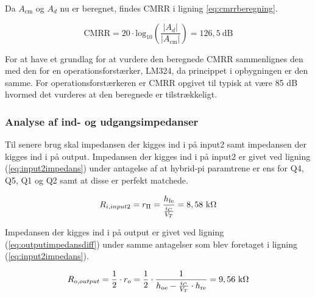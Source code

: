 Da $A_\mathrm{cm}$ og $A_d$ nu er beregnet, findes CMRR i ligning \ref{eq:cmrrberegning}.

\begin{equation}
\mathrm{CMRR}=20 \cdot \mathrm{log}_10 \left( \frac{|A_d|}{|A_\mathrm{cm}|}\right)=126,5~\mathrm{dB}
\label{eq:cmrrberegning}
\end{equation}

For at have et grundlag for at vurdere den beregnede CMRR sammenlignes den med den for en operationsforstærker, LM324, da princippet i opbygningen er den samme. For operationsforstærkeren er CMRR opgivet til typisk at være 85 dB hvormed det vurderes at den beregnede er tilstrækkeligt. 

\subsubsection*{Analyse af ind- og udgangsimpedanser}
Til senere brug skal impedansen der kigges ind i på input2 samt impedansen der kigges ind i på output. 
Impedansen der kigges ind i på input2 er givet ved ligning (\ref{eq:input2impedans}) under antagelse af at hybrid-pi paramtrene er ens for Q4, Q5, Q1 og Q2 samt at disse er perfekt matchede. 

\begin{equation}
R_{i, input2}= r_\Pi = \frac{h_\mathrm{fe}}{\frac{i_C}{V_T}} = 8,58~\mathrm{k}\ohm
\label{eq:input2impedans}
\end{equation}

Impedansen der kigges ind i på output er givet ved ligning (\ref{eq:outputimpedansdiff}) under samme antagelser som blev foretaget i ligning (\ref{eq:input2impedans}).

\begin{equation}
R_{o, output} = \frac{1}{2} \cdot r_o = \frac{1}{2} \cdot \frac{1}{h_\mathrm{oe} - \frac{i_C}{V_T} \cdot h_\mathrm{re}} = 9,56~\mathrm{k}\ohm
\label{eq:outputimpedansdiff}
\end{equation}
